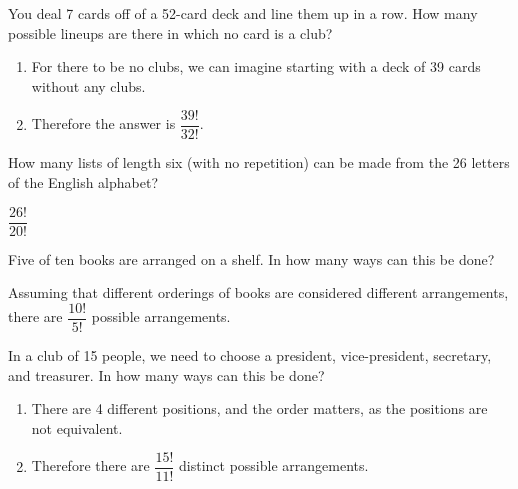 \documentclass[openany, 11pt]{book}
\begin{document}
\begin{exercise}{}{}
	You deal 7 cards off of a 52-card deck and line them up in
	a row. How many possible lineups are there in which no card is a club?
	\begin{enumerate}[label={\textbullet}, leftmargin=*, itemsep=0pt, parsep=0pt]
		\item For there to be no clubs, we can imagine starting with a deck of 39
		      cards without any clubs.
		\item Therefore the answer is $\dfrac{39!}{32!}$. \square
	\end{enumerate}
\end{exercise}

\begin{exercise}{}{}
	How many lists of length six (with no repetition) can be
	made from the 26 letters of the English alphabet?

	$\dfrac{26!}{20!}$\square
\end{exercise}

\begin{exercise}{}{}
	Five of ten books are arranged on a shelf. In how many ways can this be done?

	Assuming that different orderings of books are considered different
	arrangements, there are $\dfrac{10!}{5!}$ possible arrangements. \square
\end{exercise}

\begin{exercise}{}{}
	In a club of 15 people, we need to choose a president,
	vice-president, secretary, and treasurer. In how many ways can this be done?
	\begin{enumerate}[label={\textbullet}, leftmargin=*, itemsep=0pt, parsep=0pt]
		\item There are 4 different positions, and the order matters, as the positions
		      are not equivalent.
		\item Therefore there are $\dfrac{15!}{11!}$ distinct possible
		      arrangements. \square
	\end{enumerate}
\end{exercise}
\end{document}
